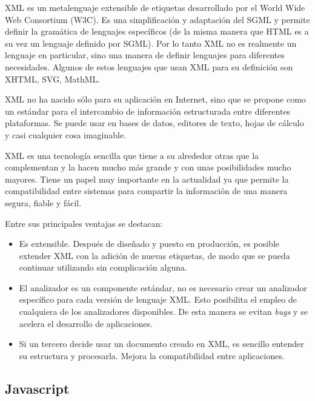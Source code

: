     XML es un metalenguaje extensible de etiquetas desarrollado por el World Wide Web Consortium (W3C). Es una simplificación y adaptación del SGML y permite definir la gramática de lenguajes específicos (de la misma manera que HTML es a su vez un lenguaje definido por SGML). Por lo tanto XML no es realmente un lenguaje en particular, sino una manera de definir lenguajes para diferentes necesidades. Algunos de estos lenguajes que usan XML para su definición son XHTML, SVG, MathML.
    
    XML no ha nacido sólo para su aplicación en Internet, sino que se propone como un estándar para el intercambio de información estructurada entre diferentes plataformas. Se puede usar en bases de datos, editores de texto, hojas de cálculo y casi cualquier cosa imaginable.
    
    XML es una tecnología sencilla que tiene a su alrededor otras que la complementan y la hacen mucho más grande y con unas posibilidades mucho mayores. Tiene un papel muy importante en la actualidad ya que permite la compatibilidad entre sistemas para compartir la información de una manera segura, fiable y fácil.
    
    Entre sus principales ventajas se destacan:
    
      \begin{itemize}
        \item Es extensible. Después de diseñado y puesto en producción, es posible extender XML con la adición de nuevas etiquetas, de modo que se pueda continuar utilizando sin complicación alguna.
        \item El analizador es un componente estándar, no es necesario crear un analizador específico para cada versión de lenguaje XML. Esto posibilita el empleo de cualquiera de los analizadores disponibles. De esta manera se evitan {\it bugs} y se acelera el desarrollo de aplicaciones.
        \item Si un tercero decide usar un documento creado en XML, es sencillo entender su estructura y procesarla. Mejora la compatibilidad entre aplicaciones.
      \end{itemize}
      
  
  \subsection{Javascript} %
    \label{sub:tec_javascript}
  
